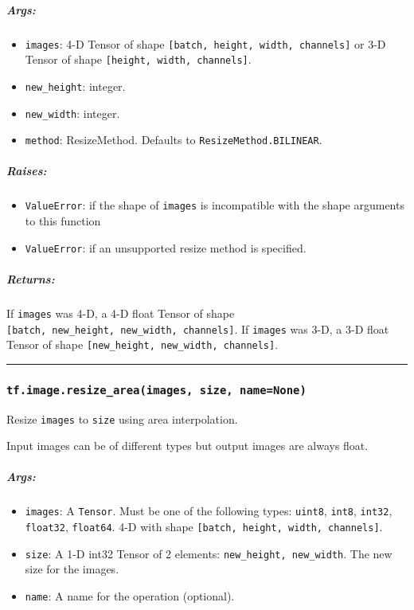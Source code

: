 \subparagraph{Args: }\label{args-4}

\begin{itemize}
\tightlist
\item
  \texttt{images}: 4-D Tensor of shape
  \texttt{{[}batch,\ height,\ width,\ channels{]}} or 3-D Tensor of
  shape \texttt{{[}height,\ width,\ channels{]}}.
\item
  \texttt{new\_height}: integer.
\item
  \texttt{new\_width}: integer.
\item
  \texttt{method}: ResizeMethod. Defaults to
  \texttt{ResizeMethod.BILINEAR}.
\end{itemize}

\subparagraph{Raises: }\label{raises}

\begin{itemize}
\tightlist
\item
  \texttt{ValueError}: if the shape of \texttt{images} is incompatible
  with the shape arguments to this function
\item
  \texttt{ValueError}: if an unsupported resize method is specified.
\end{itemize}

\subparagraph{Returns: }\label{returns-4}

If \texttt{images} was 4-D, a 4-D float Tensor of shape
\texttt{{[}batch,\ new\_height,\ new\_width,\ channels{]}}. If
\texttt{images} was 3-D, a 3-D float Tensor of shape
\texttt{{[}new\_height,\ new\_width,\ channels{]}}.

\begin{center}\rule{0.5\linewidth}{\linethickness}\end{center}

\subsubsection{\texorpdfstring{\texttt{tf.image.resize\_area(images,\ size,\ name=None)}
}{tf.image.resize\_area(images, size, name=None) }}\label{tf.image.resizeux5fareaimages-size-namenone}

Resize \texttt{images} to \texttt{size} using area interpolation.

Input images can be of different types but output images are always
float.

\subparagraph{Args: }\label{args-5}

\begin{itemize}
\tightlist
\item
  \texttt{images}: A \texttt{Tensor}. Must be one of the following
  types: \texttt{uint8}, \texttt{int8}, \texttt{int32},
  \texttt{float32}, \texttt{float64}. 4-D with shape
  \texttt{{[}batch,\ height,\ width,\ channels{]}}.
\item
  \texttt{size}: A 1-D int32 Tensor of 2 elements:
  \texttt{new\_height,\ new\_width}. The new size for the images.
\item
  \texttt{name}: A name for the operation (optional).
\end{itemize}

